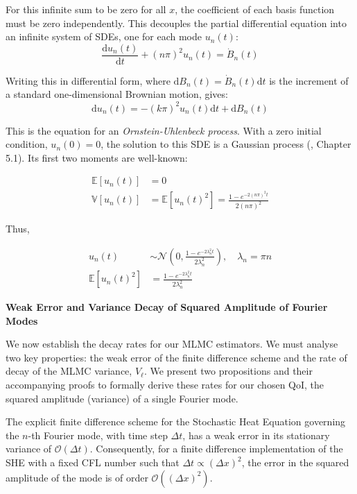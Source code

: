 For
this infinite sum to be zero for all $x$, the coefficient of each basis
function must be zero independently. This decouples the partial differential 
equation into an infinite system of SDEs, one for each mode 
$u_n(t)$: 
$$\frac{\mathrm{d}u_n(t)}{\mathrm{d}t} + (n\pi)^2 u_n(t) = \dot{B}_n(t)$$

Writing this in differential form, where $\mathrm{d}B_n(t) = 
\dot{B}_n(t)\mathrm{d}t$ is the 
increment of a standard one-dimensional Brownian motion, 
gives:
$$
\mathrm{d}u_n(t) = -(k\pi)^2 u_n(t)\mathrm{d}t + \mathrm{d}B_n(t)
$$ 

This is the equation for an \textit{Ornstein-Uhlenbeck process}.
With a zero initial condition, $u_n(0)=0$, the solution to 
this SDE is a Gaussian process (\cite{oksendal2013stochastic}, Chapter 5.1). 
Its first two moments are well-known:

\begin{align}\label{eq:moments_of_fourier_modes}
\mathbb{E}[u_n(t)] &= 0 \\
\mathbb{V}[u_n(t)] &= \mathbb{E}[u_n(t)^2] = 
 \frac{1 - e^{-2(n\pi)^2 t}}{2(n\pi)^2} \label{eq:var_fourier_modes}
\end{align}

Thus,

\begin{align}
    u_n(t) &\sim \mathcal{N}(0, 
    \frac{1-e^{-2\lambda_n^2t}}{2\lambda_n^2}), 
    \quad \lambda_n = \pi n
    \nonumber
    \\
    \mathbb{E}\left[u_n(t)^2\right] &= \frac{1 - e^{-2\lambda_n^2t}}{2\lambda_n^2}
    \label{eq:squared_amplitude_analytic}
\end{align}
\newline

\textbf{Weak Error and Variance Decay of Squared Amplitude of Fourier Modes}

We now establish the decay
rates for our MLMC estimators. We must analyse two key properties:
the weak error of the finite difference scheme and the rate 
of decay of the MLMC variance, $V_\ell$. We present 
two propositions and their accompanying proofs to formally 
derive these rates for our chosen QoI, the squared amplitude (variance)
of a single Fourier mode. 

\begin{proposition}
    \label{prop:weak_error_for_fourier_mode}
    The explicit finite difference scheme for the Stochastic Heat Equation
    governing the $n$-th Fourier mode, with time step $\Delta t$, has a weak error 
    in its stationary variance of 
    $\mathcal{O}(\Delta t)$. Consequently, for a finite difference 
    implementation of the SHE with a fixed CFL number such that 
    $\Delta t \propto (\Delta x)^2$, the error in the squared amplitude of the mode 
    is of order $\mathcal{O}((\Delta x)^2)$. 
\end{proposition}

